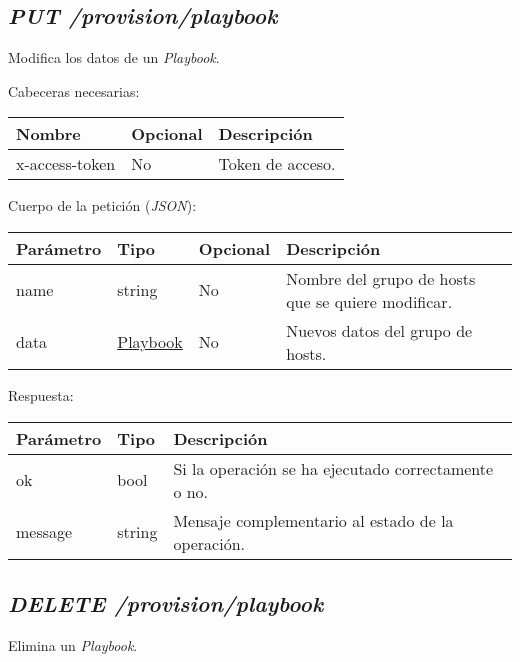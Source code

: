 	
	\subsection{\textit{PUT /provision/playbook}}
		Modifica los datos de un \textit{Playbook}.
		
		Cabeceras necesarias:
		\begin{table}[h!]
			\centering
	\begin{adjustbox}{max width=\textwidth}
			\begin{tabular}{|l|l|l|}
				\hline
				Nombre & Opcional & Descripción \\ \hline
				x-access-token & No & Token de acceso. \\ \hline
			\end{tabular}
\end{adjustbox}
		\end{table}
		
		Cuerpo de la petición (\textit{JSON}):
		\begin{table}[h!]
			\centering
	\begin{adjustbox}{max width=\textwidth}
			\begin{tabularx}{\linewidth}{|l|l|l|L|}
				\hline
				Parámetro & Tipo & Opcional & Descripción \\ \hline
				name & string & No & Nombre del grupo de hosts que se quiere modificar. \\ \hline
				data & \hyperref[sec:playbook]{Playbook} & No & Nuevos datos del grupo de hosts. \\ \hline
			\end{tabularx}
\end{adjustbox}
		\end{table}
		
		
		Respuesta:
		\begin{table}[h!]
			\centering
	\begin{adjustbox}{max width=\textwidth}
			\begin{tabular}{|l|l|l|}
				\hline
				Parámetro & Tipo & Descripción \\ \hline
				ok & bool & Si la operación se ha ejecutado correctamente o no. \\ \hline
				message & string & Mensaje complementario al estado de la operación. \\ \hline
			\end{tabular}
\end{adjustbox}
		\end{table}
	
	\subsection{\textit{DELETE /provision/playbook}}
		Elimina un \textit{Playbook}.
		
